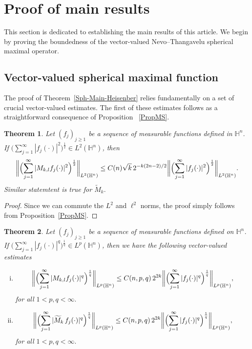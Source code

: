 \documentclass[11pt]{amsart}
\newcommand{\Ha}{\mathbb{H}^n}
\newtheorem{theorem}{Theorem}[section]
\theoremstyle{definition}
\numberwithin{equation}{section}
\begin{document}
\section{Proof of main results}
\label{Main-Sec}
This section is dedicated to establishing the main results of this article. We begin by proving the boundedness of the vector-valued Nevo--Thangavelu spherical maximal operator.
\subsection{Vector-valued spherical maximal function}
The proof of Theorem~\ref{Sph-Main-Heisenber} relies fundamentally on a set of crucial vector-valued estimates. The first of these estimates follows as a straightforward consequence of Proposition ~\ref{PropMS}.
\begin{theorem}
\label{l2}
Let $(f_j)_{j\geq1}$ be a sequence of measurable functions defined in $\Ha$. If $\bigl(\sum_{j=1}^{\infty}|f_j(\cdot)|^2\bigr)^\frac{1}{2} \in L^2(\Ha)$, then
\[
\biggl\|\Bigl(\sum_{j=1}^{\infty}|M_{k, l}f_j(\cdot)|^2\Bigr)^\frac{1}{2}\biggr\|_{L^2(\Ha)}\leq C(n)\sqrt{k}\, 2^{-k(2n-2)/2}\biggl\|\Bigl(\sum_{j=1}^{\infty}|f_j(\cdot)|^2\Bigr)^\frac{1}{2}\biggr\|_{L^2(\Ha)}.
\]
Similar statemtent is true for $\widetilde M_k.$
\end{theorem}
\begin{proof}
Since we can commute the $L^2$ and $\ell^2$ norms, the proof simply follows from Proposition~\ref{PropMS}.     
\end{proof}

\begin{theorem}
\label{FS}
Let $(f_j)_{j\geq1}$ be a sequence of measurable functions defined on $\Ha$. If $\bigl(\sum_{j=1}^{\infty}|f_j(\cdot)|^q\bigr)^\frac{1}{q} \in L^p(\Ha)$, then we have the following vector-valued estimates
\begin{enumerate}[i)]
    \item 
    \label{item1}
\[
\biggl\|\Bigl(\sum_{j=1}^{\infty}|M_{k, l}f_j(\cdot)|^q\Bigr)^\frac{1}{q}\biggr\|_{L^p(\Ha)}\leq C(n, p, q)\,2^{2k}\biggl\|\Bigl(\sum_{j=1}^{\infty}|f_j(\cdot)|^q\Bigr)^\frac{1}{q}\biggr\|_{L^p(\Ha)},\]
for all $1<p, q<\infty.$
\item 
\label{item2} 
\[
\biggl\|\Bigl(\sum_{j=1}^{\infty}|\widetilde M_k \,f_j(\cdot)|^q\Bigr)^\frac{1}{q}\biggr\|_{L^p(\Ha)}\leq C(n, p, q)\,2^{2k}\biggl\|\Bigl(\sum_{j=1}^{\infty}|f_j(\cdot)|^q\Bigr)^\frac{1}{q}\biggr\|_{L^p(\Ha)},\]
for all $1<p, q<\infty.$
\end{enumerate}
\end{theorem}
\end{document}
